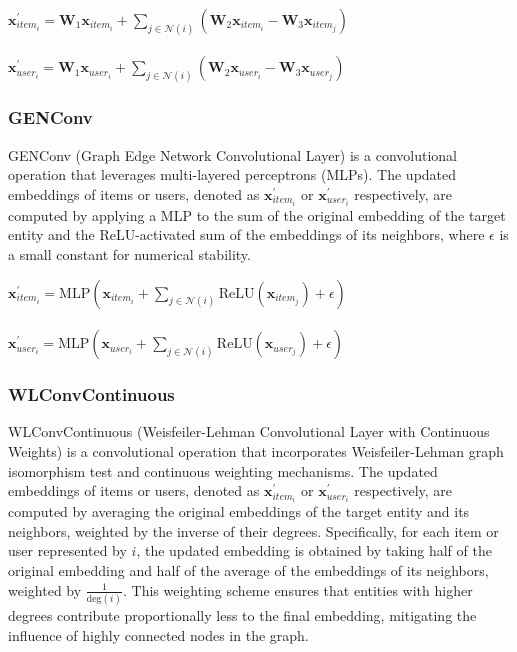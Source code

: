 \documentclass{scrartcl}
\begin{document}
\begin{center}
    $\mathbf{x}^{\prime}_{item_{i}} = \mathbf{W}_1 \mathbf{x}_{item_{i}} +
    \sum_{j \in \mathcal{N}(i)}
    (\mathbf{W}_2 \mathbf{x}_{item_{i}} - \mathbf{W}_3 \mathbf{x}_{item_{j}})$ \\~\\
    $\mathbf{x}^{\prime}_{user_{i}} = \mathbf{W}_1 \mathbf{x}_{user_{i}} +
    \sum_{j \in \mathcal{N}(i)}
    (\mathbf{W}_2 \mathbf{x}_{user_{i}} - \mathbf{W}_3 \mathbf{x}_{user_{j}})$
\end{center}

\subsubsection{GENConv\cite{genconv}} 

\quad GENConv (Graph Edge Network Convolutional Layer) is a convolutional operation that leverages multi-layered perceptrons (MLPs). The updated embeddings of items or users, denoted as $\mathbf{x}^{\prime}_{item_i}$ or $\mathbf{x}^{\prime}_{user_i}$ respectively, are computed by applying a MLP to the sum of the original embedding of the target entity and the ReLU-activated sum of the embeddings of its neighbors, where $\epsilon$ is a small constant for numerical stability. \\ 

\begin{center}
    $\mathbf{x}_{item_{i}}^{\prime} = \mathrm{MLP} \left( \mathbf{x}_{item_{i}} +
    \sum_{j \in \mathcal{N}(i)} 
    \mathrm{ReLU} \left( \mathbf{x}_{item_{j}} \right) +\epsilon \right)$ \\~\\
    $\mathbf{x}_{user_{i}}^{\prime} = \mathrm{MLP} \left( \mathbf{x}_{user_{i}} +
    \sum_{j \in \mathcal{N}(i)} 
    \mathrm{ReLU} \left( \mathbf{x}_{user_{j}} \right) +\epsilon \right)$ 
\end{center}

\subsubsection{WLConvContinuous\cite{wlconvcontinuous}} 

\quad WLConvContinuous (Weisfeiler-Lehman Convolutional Layer with Continuous Weights) is a convolutional operation that incorporates Weisfeiler-Lehman graph isomorphism test and continuous weighting mechanisms. The updated embeddings of items or users, denoted as $\mathbf{x}^{\prime}_{item_i}$ or $\mathbf{x}^{\prime}_{user_i}$ respectively, are computed by averaging the original embeddings of the target entity and its neighbors, weighted by the inverse of their degrees. Specifically, for each item or user represented by $i$, the updated embedding is obtained by taking half of the original embedding and half of the average of the embeddings of its neighbors, weighted by $\frac{1}{\text{deg}(i)}$. This weighting scheme ensures that entities with higher degrees contribute proportionally less to the final embedding, mitigating the influence of highly connected nodes in the graph. \\ 
\end{document}
